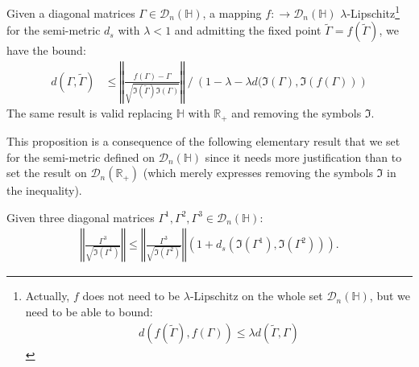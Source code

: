 \documentclass[a4papaer, titlepage]{book}
\begin{document}
  \begin{proposition}\label{pro:equation_proche_implique_solution_proche_version_statique}
  Given a diagonal matrices $\Gamma \in \mathcal D_n(\mathbb H)$, a mapping $f: \to \mathcal D_{n} (\mathbb H)$ $\lambda$-Lipschitz\footnote{Actually, $f$ does not need to be $\lambda$-Lipschitz on the whole set $\mathcal D_{n}(\mathbb H)$, but we need to be able to bound:
  \begin{align*}
    d(f(\tilde \Gamma), f(\Gamma)) \leq \lambda d(\tilde \Gamma, \Gamma)
  \end{align*}} for the semi-metric $d_s$ with $\lambda < 1$ and admitting the fixed point $\tilde \Gamma = f(\tilde \Gamma)$, we have the bound: 
  \begin{align*}
    d( \Gamma , \tilde \Gamma)
    &\leq \left\Vert \frac{f(\Gamma) - \Gamma}{\sqrt{\Im(\tilde \Gamma) \Im(\Gamma)}}\right\Vert\  / \ \left( 1 - \lambda- \lambda d(\Im(\Gamma), \Im(f(\Gamma)) \right) 
  \end{align*}
  The same result is valid replacing $\mathbb H$ with $\mathbb R_+$ and removing the symbols $\Im$.
  \end{proposition}
  This proposition is a consequence of the following elementary result that we set for  the semi-metric defined on $\mathcal D_n(\mathbb H)$ since it needs more justification than to set the result on $\mathcal D_n(\mathbb R_+)$ (which merely expresses removing the symbols $\Im$ in the inequality).
  \begin{lemma}\label{lem:tool_matrices_diag_d_s}
    Given three diagonal matrices $\Gamma^1, \Gamma^2, \Gamma^3 \in \mathcal D_n(\mathbb H)$:
    \begin{align*}
      \left\Vert \frac{\Gamma^3}{\sqrt{\Im(\Gamma^1) }}\right\Vert \leq \left\Vert \frac{\Gamma^3}{\sqrt{\Im(\Gamma^2) }}\right\Vert \left(1 + d_s(\Im(\Gamma^1), \Im(\Gamma^2)) \right).
    \end{align*}
  \end{lemma}
\end{document}
